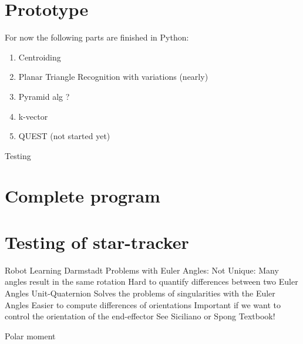 \documentclass[12pt,a4paper,oneside]{article}
\begin{document}
\section{Prototype}
For now the following parts are finished in Python:
\begin{enumerate}
\item Centroiding
\item Planar Triangle Recognition with variations (nearly)
\item Pyramid alg ?
\item k-vector
\item QUEST (not started yet)
\end{enumerate}
Testing\par
\cite{kruijff2003star}
\newpage
\section{Complete program}

\newpage
\section{Testing of star-tracker}
\cite{RIS_0}

\newpage






\newpage

\listoftables

\newpage

\listoffigures

\newpage


Robot Learning Darmstadt
Problems with Euler Angles:
Not Unique: Many angles result in the same rotation
Hard to quantify differences between two Euler Angles
Unit-Quaternion
Solves the problems of singularities with the Euler Angles
Easier to compute differences of orientations
Important if we want to control the orientation of the end-effector
See Siciliano or Spong Textbook!


Polar moment
\end{document}
